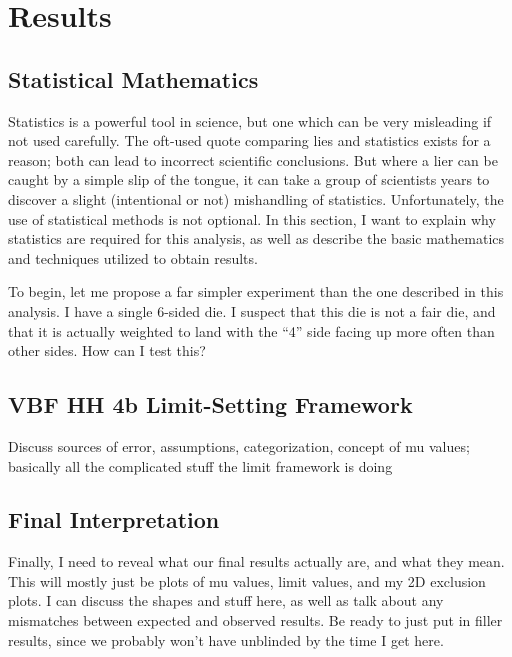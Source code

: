 \chapter{Results} \label{ch:results}

\section{Statistical Mathematics}

    Statistics is a powerful tool in science,
        but one which can be very misleading if not used carefully.
    The oft-used quote comparing lies and statistics exists for a reason;
        both can lead to incorrect scientific conclusions.
    But where a lier can be caught by a simple slip of the tongue,
        it can take a group of scientists years to discover a slight (intentional or not) mishandling of statistics.
    Unfortunately, the use of statistical methods is not optional.
    In this section, I want to explain why statistics are required for this analysis,
        as well as describe the basic mathematics and techniques utilized to obtain results.

    To begin, let me propose a far simpler experiment than the one described in this analysis.
    I have a single 6-sided die.
    I suspect that this die is not a fair die,
        and that it is actually weighted to land with the ``4'' side facing up more often than other sides.
    How can I test this?
        


\section{VBF \to HH \to 4b Limit-Setting Framework}

    Discuss sources of error, assumptions, categorization, concept of mu values;
    basically all the complicated stuff the limit framework is doing

\section{Final Interpretation}

    Finally, I need to reveal what our final results actually are, and what they mean.
    This will mostly just be plots of mu values, limit values, and my 2D exclusion plots.
    I can discuss the shapes and stuff here, as well as talk about any mismatches between expected and observed results.
    Be ready to just put in filler results, since we probably won't have unblinded by the time I get here.


